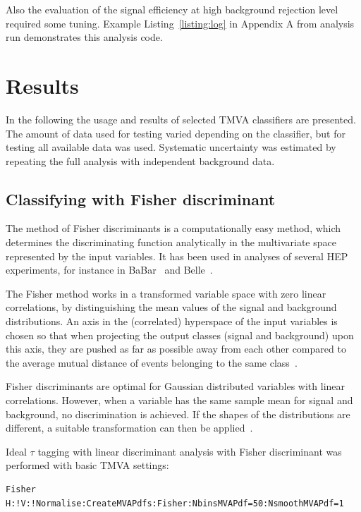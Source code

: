 \documentclass[a4paper]{jpconf}
\begin{document}
Also the evaluation of the signal efficiency at high background rejection
level required some tuning.
Example Listing~\ref{listing:log} in Appendix A from analysis run demonstrates this analysis code.


\section{Results}\label{sec:results}
In the following the usage and results of selected TMVA classifiers are presented.
The amount of data used for testing varied depending on the classifier, 
but for testing all available data was used.
Systematic uncertainty was estimated by repeating the full analysis with independent background data.

\subsection{Classifying with Fisher discriminant}
The method of Fisher discriminants is a computationally easy method,
which determines the discriminating function analytically in the
multivariate space represented by the input variables.  
It has been used in analyses of several HEP experiments, 
for instance in BaBar~\cite{fisherbabar} and Belle~\cite{fisherbelle}.

The Fisher method works in a transformed variable space with zero
linear correlations, by distinguishing the mean values of the signal
and background distributions. An axis in the (correlated) hyperspace
of the input variables is chosen so that when projecting the output
classes (signal and background) upon this axis, they are pushed as far
as possible away from each other compared to the average mutual
distance of events belonging to the same class~\cite{tmvasite}.

Fisher discriminants are optimal for Gaussian distributed variables
with linear correlations. 
However, when a variable has the same sample mean for signal and background, 
no discrimination is achieved. 
If the shapes of the distributions are different, 
a suitable transformation can then be applied~\cite{tmvasite}.


Ideal $\tau$ tagging with linear discriminant analysis  with Fisher discriminant
was performed with basic TMVA settings:

\begin{verbatim}
Fisher H:!V:!Normalise:CreateMVAPdfs:Fisher:NbinsMVAPdf=50:NsmoothMVAPdf=1
\end{verbatim}
\end{document}
